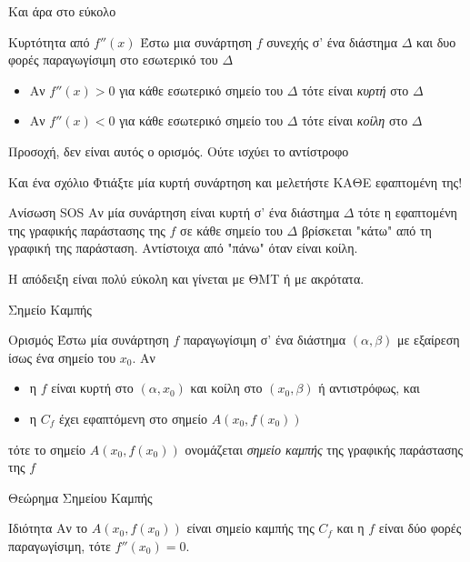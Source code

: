 \documentclass{presentation}
\begin{document}
\begin{frame}{Και άρα στο εύκολο}
  \begin{block}{Κυρτότητα από $f''(x)$}
    Έστω μια συνάρτηση $f$ συνεχής σ’ ένα διάστημα $Δ$ και δυο φορές παραγωγίσιμη στο εσωτερικό του $Δ$
    \begin{itemize}
      \item Αν $f''(x)>0$ για κάθε εσωτερικό σημείο του $Δ$ τότε είναι \emph{κυρτή} στο $Δ$
      \item Αν $f''(x)<0$ για κάθε εσωτερικό σημείο του $Δ$ τότε είναι \emph{κοίλη} στο $Δ$
    \end{itemize}
  \end{block}
   Προσοχή, δεν είναι αυτός ο ορισμός. Ούτε ισχύει το αντίστροφο
\end{frame}

\begin{frame}{Και ένα σχόλιο}
  Φτιάξτε μία κυρτή συνάρτηση και μελετήστε ΚΑΘΕ εφαπτομένη της!
  \begin{block}{Ανίσωση SOS}
    Αν μία συνάρτηση είναι κυρτή σ' ένα διάστημα $Δ$ τότε η εφαπτομένη της γραφικής παράστασης της $f$ σε κάθε σημείο του $Δ$ βρίσκεται "κάτω" από τη γραφική της παράσταση. Αντίστοιχα από "πάνω" όταν είναι κοίλη.
  \end{block}
   Η απόδειξη είναι πολύ εύκολη και γίνεται με ΘΜΤ ή με ακρότατα.
\end{frame}

\begin{frame}{Σημείο Καμπής}
  \begin{block}{Ορισμός}
    Έστω μία συνάρτηση $f$ παραγωγίσιμη σ' ένα διάστημα $(α,β)$ με εξαίρεση ίσως ένα σημείο του $x_0$. Αν
    \begin{itemize}
      \item η $f$ είναι κυρτή στο $(α,x_0)$ και κοίλη στο $(x_0,β)$ ή αντιστρόφως, και
      \item η $C_f$ έχει εφαπτόμενη στο σημείο $Α(x_0,f(x_0))$
    \end{itemize}
    τότε το σημείο $Α(x_0,f(x_0))$ ονομάζεται \emph{σημείο καμπής} της γραφικής παράστασης της $f$
  \end{block}
\end{frame}

\begin{frame}[label=Θεώρημα1]{Θεώρημα Σημείου Καμπής}
  \begin{block}{Ιδιότητα}
    Αν το $Α(x_0,f(x_0))$ είναι σημείο καμπής της $C_f$ και η $f$ είναι δύο φορές παραγωγίσιμη, τότε $f''(x_0)=0$.
  \end{block}

  \hyperlink{Απόδειξη1}{}
\end{frame}
\end{document}
